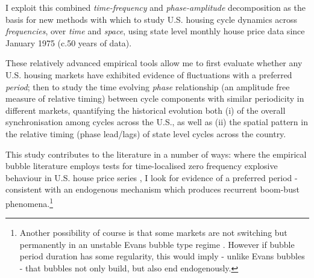 \documentclass[11pt]{article}
\begin{document}
I exploit this combined \textit{time-frequency} and \textit{phase-amplitude} decomposition 
as the basis for new methods with which to study U.S. housing cycle dynamics across \textit{frequencies}, over \textit{time} and \textit{space}, using state level monthly house price data since January 1975 (c.50 years of data).


These relatively advanced empirical tools allow me to first evaluate whether any U.S. housing markets have exhibited evidence of fluctuations with a preferred \textit{period}; then to study the time evolving \textit{phase} relationship (an amplitude free measure of relative timing) between cycle components with similar periodicity in different markets, quantifying the historical evolution both (i) of the overall synchronisation among cycles across the U.S., as well as (ii) the spatial pattern in the relative timing (phase lead/lags) of state level cycles across the country.



This study contributes to the literature in a number of ways: where the empirical bubble literature employs tests for time-localised zero frequency explosive behaviour in U.S. house price series \citep{Kivedal2013,Phillips2011a,Zhou2005,Bolt2014}, I look for evidence of a preferred period - consistent with an endogenous mechanism which produces recurrent
boom-bust phenomena.\footnote{Another possibility of course is that some markets are not switching but permanently in an unstable Evans bubble type regime \citep{Evans1991}. However if bubble period duration has some regularity, this would imply - unlike Evans bubbles - that bubbles not only build, but also end endogenously.} 
\end{document}
